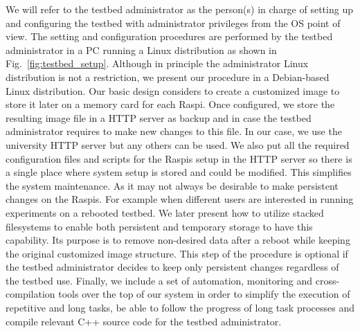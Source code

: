 We will refer to the
testbed administrator as the person(s) in charge of setting up and
configuring the testbed with administrator privileges from the \ac{OS}
point of view. The setting and configuration procedures are
performed by the testbed administrator in a \ac{PC} running a
Linux distribution as shown in Fig.~\ref{fig:testbed_setup}. Although in principle the administrator
Linux distribution is not a restriction, we present our procedure in a
Debian-based Linux distribution. Our basic design considers to create
a customized image to store it later on a memory card for each \ac{Raspi}.
Once configured, we store the resulting image file in a \ac{HTTP} server
as backup and in case the testbed administrator requires to make new
changes to this file. In our case, we use the university \ac{HTTP} server but
any others can be used. We also put all the required
configuration files and scripts for the \ac{Raspi}s setup in the \ac{HTTP}
server so there is a single place where system setup is stored and could be
modified. This simplifies the system maintenance.
As it may not always be desirable to make persistent changes
on the \ac{Raspi}s. For example when different users are interested in
running experiments on a rebooted testbed. We later present how
to utilize stacked filesystems to enable both persistent and
temporary storage to have this capability. Its purpose is to
remove non-desired data after a reboot while keeping the original
customized image structure. This step of the procedure is optional if
the testbed administrator decides to keep only persistent changes regardless
of the testbed use. Finally, we include a set of automation, monitoring
and cross-compilation tools over the top of our system in order to simplify
the execution of repetitive and long tasks, be able to follow the progress
of long task processes and compile relevant C++ source code for the testbed
administrator.


